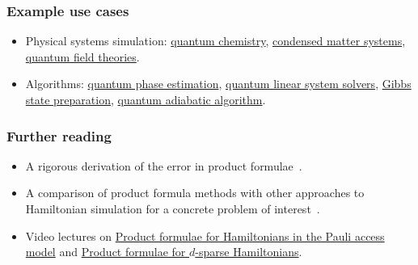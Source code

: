 \begin{refsection}
\subsubsection*{Example use cases}
\begin{itemize}
\item Physical systems simulation: \hyperref[appl:QuantumChemistry]{quantum chemistry}, \hyperref[appl:CondensedMatter]{condensed matter systems}, \hyperref[appl:QuantumFieldTheories]{quantum field theories}. 
\item Algorithms: \hyperref[prim:QPE]{quantum phase estimation}, \hyperref[prim:QuantumLinearSystemSolvers]{quantum linear system solvers}, \hyperref[prim:GibbsSampling]{Gibbs state preparation}, \hyperref[prim:QuantumAdiabaticAlgorithm]{quantum adiabatic algorithm}.
\end{itemize}




\subsubsection*{Further reading}

\begin{itemize}
    \item A rigorous derivation of the error in product formulae~\cite{childs2021TheoryTrotter}.
    \item A comparison of product formula methods with other approaches to Hamiltonian simulation for a concrete problem of interest~\cite{childs2018towardsFirstQSimSpeedup}.
    \item Video lectures on \href{https://youtu.be/tJUi4g_-AIk}{Product formulae for Hamiltonians in the Pauli access model} and \href{https://youtu.be/tllz6y7WUUs}{Product formulae for $d$-sparse Hamiltonians}.
\end{itemize}



\printbibliography[heading=secbib,segment=\therefsegment]
\end{refsection}

\newpage


